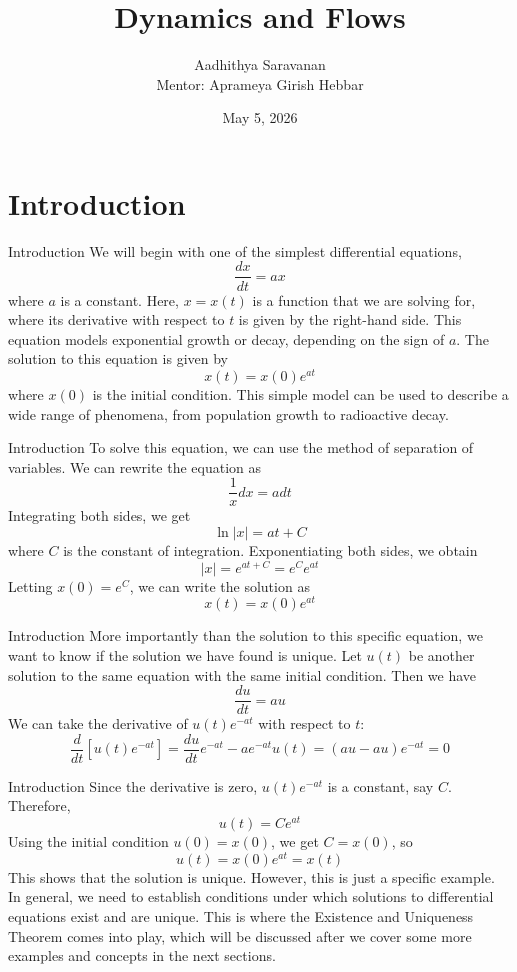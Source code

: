 \documentclass{beamer}
\title[Dynamics and Flows]{Dynamics and Flows}
\author[Aadhithya Saravanan]{Aadhithya Saravanan\\[0.5em] Mentor: Aprameya Girish Hebbar}
\date{May 5, 2026}
\begin{document}
\section{Introduction}

\begin{frame}
    \titlepage
\end{frame}

\begin{frame}{Introduction}
    We will begin with one of the simplest differential equations,
    \[
        \frac{dx}{dt} = ax
    \]
    where $a$ is a constant. Here, $x=x(t)$ is a function that we are solving for, where its derivative with respect to $t$ is given by the right-hand side. This equation models exponential growth or decay, depending on the sign of $a$. The solution to this equation is given by
    \[
        x(t) = x(0)e^{at}
    \]
    where $x(0)$ is the initial condition. This simple model can be used to describe a wide range of phenomena, from population growth to radioactive decay.
\end{frame}

\begin{frame}{Introduction}
    To solve this equation, we can use the method of separation of variables. We can rewrite the equation as
    \[
        \frac{1}{x} dx = a dt
    \]
    Integrating both sides, we get
    \[
        \ln|x| = at + C
    \]
    where $C$ is the constant of integration. Exponentiating both sides, we obtain
    \[
        |x| = e^{at + C} = e^C e^{at}
    \]
    Letting $x(0) = e^C$, we can write the solution as
    \[
        x(t) = x(0)e^{at}
    \]
\end{frame}

\begin{frame}{Introduction}
    More importantly than the solution to this specific equation, we want to know if the solution we have found is unique. Let $u(t)$ be another solution to the same equation with the same initial condition. Then we have
    \[
        \frac{du}{dt} = au
    \]
    We can take the derivative of $u(t)e^{-at}$ with respect to $t$:
    \[
        \frac{d}{dt}[u(t)e^{-at}] = \frac{du}{dt}e^{-at} - ae^{-at}u(t) = (au - au)e^{-at} = 0
    \]
\end{frame}

\begin{frame}{Introduction}
    Since the derivative is zero, $u(t)e^{-at}$ is a constant, say $C$. Therefore,
    \[
        u(t) = Ce^{at}
    \]
    Using the initial condition $u(0) = x(0)$, we get $C = x(0)$, so
    \[
        u(t) = x(0)e^{at} = x(t)
    \]
    This shows that the solution is unique. However, this is just a specific example. In general, we need to establish conditions under which solutions to differential equations exist and are unique. This is where the Existence and Uniqueness Theorem comes into play, which will be discussed after we cover some more examples and concepts in the next sections.
\end{frame}
\end{document}

